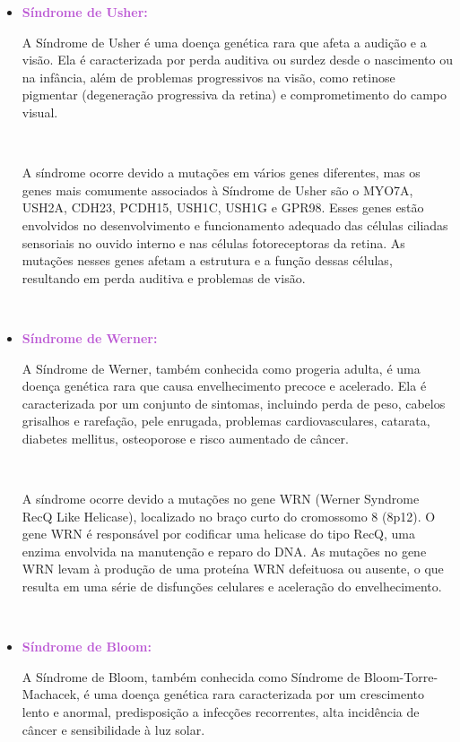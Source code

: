 \documentclass[11pt,a4paper]{article}
\begin{document}
\begin{itemize}[label=\textcolor{CarnationPink}{$\blacktriangleright$}]
\begin{itemize}[label=\textcolor{CarnationPink}{$\star$}]
			\

			\item \textcolor{MediumOrchid}{\large\textbf{Síndrome de Usher:}}
			
			A Síndrome de Usher é uma doença genética rara que afeta a audição e a visão. Ela é caracterizada por perda auditiva ou surdez desde o nascimento ou na infância, além de problemas progressivos na visão, como retinose pigmentar (degeneração progressiva da retina) e comprometimento do campo visual.

			\

			A síndrome ocorre devido a mutações em vários genes diferentes, mas os genes mais comumente associados à Síndrome de Usher são o MYO7A, USH2A, CDH23, PCDH15, USH1C, USH1G e GPR98. Esses genes estão envolvidos no desenvolvimento e funcionamento adequado das células ciliadas sensoriais no ouvido interno e nas células fotoreceptoras da retina. As mutações nesses genes afetam a estrutura e a função dessas células, resultando em perda auditiva e problemas de visão.

			\

			\item \textcolor{MediumOrchid}{\large\textbf{Síndrome de Werner:}}
			
			A Síndrome de Werner, também conhecida como progeria adulta, é uma doença genética rara que causa envelhecimento precoce e acelerado. Ela é caracterizada por um conjunto de sintomas, incluindo perda de peso, cabelos grisalhos e rarefação, pele enrugada, problemas cardiovasculares, catarata, diabetes mellitus, osteoporose e risco aumentado de câncer.

			\

			A síndrome ocorre devido a mutações no gene WRN (Werner Syndrome RecQ Like Helicase), localizado no braço curto do cromossomo 8 (8p12). O gene WRN é responsável por codificar uma helicase do tipo RecQ, uma enzima envolvida na manutenção e reparo do DNA. As mutações no gene WRN levam à produção de uma proteína WRN defeituosa ou ausente, o que resulta em uma série de disfunções celulares e aceleração do envelhecimento.

			\

			\item \textcolor{MediumOrchid}{\large\textbf{Síndrome de Bloom:}}
			
			A Síndrome de Bloom, também conhecida como Síndrome de Bloom-Torre-Machacek, é uma doença genética rara caracterizada por um crescimento lento e anormal, predisposição a infecções recorrentes, alta incidência de câncer e sensibilidade à luz solar.


\end{itemize}
\end{itemize}
\end{document}
